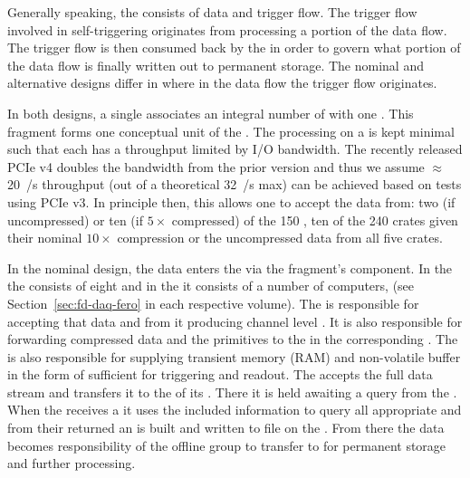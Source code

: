 Generally speaking, the  consists of data and trigger flow.
The trigger flow involved in self-triggering originates from
processing a portion of the data flow. 
The trigger flow is then consumed back by the  in order to govern
what portion of the data flow is finally written out to permanent
storage. 
The nominal and alternative designs differ in where in the data flow
the trigger flow originates. 

In both designs, a single  associates an integral
number of  with one .
This fragment forms one conceptual unit of the  .
The processing on a  is kept minimal such that each has a
throughput limited by I/O bandwidth. 
The recently released PCIe v4 doubles the bandwidth from the prior
version and thus we assume $\approx$\SI{20}{\GB/\s} throughput (out of
a theoretical \SI{32}{\GB/\s} max) can be achieved based on tests
using PCIe v3.
In principle then, this allows one  to accept the data
from: two (if uncompressed) or ten (if $5\times$ compressed) of the
\num{150} \single {}, ten of the \num{240} \dual {} crates
given their nominal $10\times$ compression or the uncompressed data
from all five   crates.

In the nominal design, the data enters the  via the fragment's
 component.
In the  the  consists of eight 
and in the  it consists of a number of 
computers, (see Section~\ref{sec:fd-daq-fero} in each respective  volume).
The  is responsible for accepting that data and from it
producing channel level .
It is also responsible for forwarding compressed data and the
primitives to the  in the corresponding .
The  is also responsible for supplying transient memory
(RAM) and non-volatile buffer in the form of  sufficient
for  triggering and readout.
The  accepts the full data stream and transfers it to the
 of its . 
There it is held awaiting a query from the . 
When the  receives a  it uses the
included information to query all appropriate  and from
their returned  an  is built and
written to file on the . 
From there the data becomes responsibility of the offline group to
transfer to \fnal for permanent storage and further processing.

